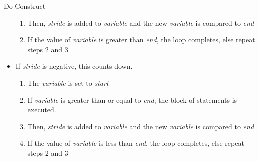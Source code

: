 \documentclass[10pt,t]{beamer}
\begin{document}
\begin{frame}{Do Construct}
\begin{itemize}
\begin{enumerate}
      \item Then, \textit{stride} is added to \textit{variable} and the new \textit{variable} is compared to \textit{end}
      \item If the value of \textit{variable} is greater than \textit{end}, the  loop completes, else repeat steps 2 and 3
    \end{enumerate}
    \item If \textit{stride} is negative, this  counts down.
    \begin{enumerate}
      \scriptsize
      \item The \textit{variable} is set to \textit{start}
      \item If \textit{variable} is greater than or equal to \textit{end}, the block of statements is executed.
      \item Then, \textit{stride} is added to \textit{variable} and the new \textit{variable} is compared to \textit{end}
      \item If the value of \textit{variable} is less than \textit{end}, the  loop completes, else repeat steps 2 and 3
    \end{enumerate}
  \end{itemize}
\end{frame}
\end{document}
